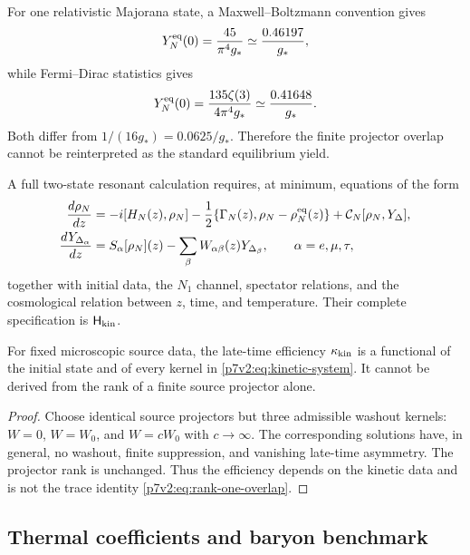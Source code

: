 \documentclass[12pt,a4paper]{article}
\newcommand{\Hkin}{\mathsf{H}_{\rm kin}}
\begin{document}
\begin{remark}
For one relativistic Majorana state, a Maxwell--Boltzmann convention gives
\[
 Y_N^{\rm eq}(0)=\frac{45}{\pi^4g_*}
 \simeq\frac{0.46197}{g_*},
\]
while Fermi--Dirac statistics gives
\[
 Y_N^{\rm eq}(0)
 =\frac{135\zeta(3)}{4\pi^4g_*}
 \simeq\frac{0.41648}{g_*}.
\]
Both differ from \(1/(16g_*)=0.0625/g_*\).  Therefore the finite projector
overlap cannot be reinterpreted as the standard equilibrium yield.
\end{remark}

\begin{definition}
\label{p7v2:def:kinetic-system}
A full two-state resonant calculation requires, at minimum, equations of the
form
\begin{align}
\label{p7v2:eq:kinetic-system}
 \frac{d\rho_N}{dz}
 &=
 -i[H_N(z),\rho_N]
 -\frac12\{\Gamma_N(z),\rho_N-\rho_N^{\rm eq}(z)\}
 +\mathcal C_N[\rho_N,Y_\Delta],\\
 \frac{dY_{\Delta_\alpha}}{dz}
 &=
 S_\alpha[\rho_N](z)
 -\sum_\beta W_{\alpha\beta}(z)Y_{\Delta_\beta},
 \qquad \alpha=e,\mu,\tau,
\end{align}
together with initial data, the \(N_1\) channel, spectator relations, and the
cosmological relation between \(z\), time, and temperature.  Their complete
specification is \(\Hkin\).
\end{definition}

\begin{theorem}
\label{p7v2:thm:efficiency-output}
For fixed microscopic source data, the late-time efficiency
\(\kappa_{\rm kin}\) is a functional of the initial state and of every kernel
in \eqref{p7v2:eq:kinetic-system}.  It cannot be derived from the rank of a
finite source projector alone.
\end{theorem}

\begin{proof}
Choose identical source projectors but three admissible washout kernels:
\(W=0\), \(W=W_0\), and \(W=cW_0\) with \(c\to\infty\).  The corresponding
solutions have, in general, no washout, finite suppression, and vanishing
late-time asymmetry.  The projector rank is unchanged.  Thus the efficiency
depends on the kinetic data and is not the trace identity
\eqref{p7v2:eq:rank-one-overlap}.
\end{proof}

\subsection{Thermal coefficients and baryon benchmark}
\label{p7v2:sec:baryon-benchmark}
\end{document}
